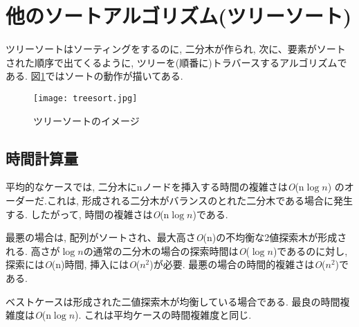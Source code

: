 \documentclass[a4j, titlepage]{jarticle}
\begin{document}
\section{他のソートアルゴリズム(ツリーソート)}
ツリーソートはソーティングをするのに, 二分木が作られ, 次に、要素がソートされた順序で出てくるように, ツリーを(順番に)トラバースするアルゴリズムである. 図\ref{tree}ではソートの動作が描いてある. 

\begin{figure}[tbh]
\centering \texttt{[image: treesort.jpg]}
\caption{ツリーソートのイメージ}
\label{tree}
\end{figure}

\subsection{時間計算量}
平均的なケースでは, 二分木にnノードを挿入する時間の複雑さは\textit{O}(n$\log n$) のオーダーだ.これは, 形成される二分木がバランスのとれた二分木である場合に発生する. したがって, 時間の複雑さは\textit{O}(n$\log n$)である.

最悪の場合は, 配列がソートされ、最大高さ\textit{O}(n)の不均衡な2値探索木が形成される. 高さが$\log n$の通常の二分木の場合の探索時間は\textit{O}($\log n$)であるのに対し, 探索には\textit{O}(n)時間, 挿入には\textit{O}($n^2$)が必要. 最悪の場合の時間的複雑さは\textit{O}($n^2$)である.

ベストケースは形成された二値探索木が均衡している場合である. 最良の時間複雑度は\textit{O}(n$\log n$). これは平均ケースの時間複雑度と同じ.
\end{document}
